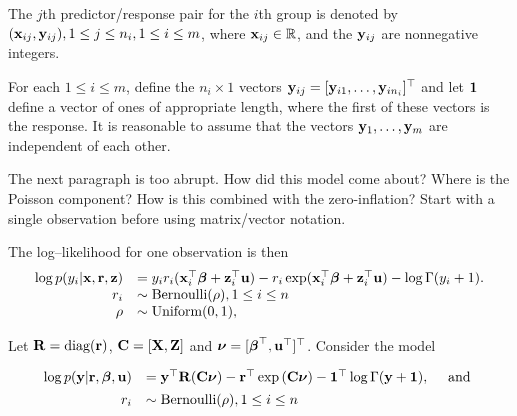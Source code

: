 \documentclass{article}[12pt]
\newcommand{\joc}[1]{{\color{red}#1}}
\begin{document}
The $j$th predictor/response pair for the $i$th group is denoted by $({\bf x}_{ij}, {\bf y}_{ij}), 1 \leq j \leq n_i, 1 \leq i \leq m$, where ${\bf x}_{ij} \in {\mathbb{R}}$, and the ${\bf y}_{ij}$ are nonnegative integers.

\noindent For each $1 \leq i \leq m$, define the $n_i \times 1$ vectors ${\bf y}_{ij} = [{\bf y}_{i 1}, \ldots, {\bf y}_{i
	n_i}]^\top$ and let ${\bf 1}$ define a vector of ones of appropriate length, where the first of these vectors is
the response. It is reasonable to assume that the vectors ${\bf y}_1, \ldots, {\bf y}_m$ are independent of each
other.

\joc{The next paragraph is too abrupt. How did this model come about? Where is the Poisson component? How is this combined with the zero-inflation?
Start with a single observation before using matrix/vector notation.}

\noindent The log--likelihood for one observation is then
\begin{equation*}
	\begin{array}{rl}
		\log p(y_i | {\bf x}, {\bf r}, {\bf z}) & = y_i r_i ({\bf x}_i^\top {\boldsymbol\beta} + {\bf z}_i^\top {\bf u}) - r_i \exp ({\bf x}_i^\top {\boldsymbol\beta} + {\bf z}_i^\top {\bf u}) - \log \Gamma (y_i + 1). \\
		r_i                         & \sim \text{Bernoulli}(\rho), 1 \leq i \leq n                                                                            \\
		\rho                        & \sim \mbox{Uniform}(0, 1),                                                                                              \\
	\end{array}
\end{equation*}

\noindent Let ${\bf R} = \text{diag}{({\bf r})}$, ${\bf C} = [{\bf X}, {\bf Z}]$ and ${\boldsymbol \nu} = [{\boldsymbol \beta}^\top, {\bf u}^\top]^\top$. Consider the model


\begin{equation}\label{eq:main}
	\begin{array}{rl}
		\log{p({\bf y}|{\bf r}, {\boldsymbol\beta}, {\bf u})} & = {\bf y}^\top {\bf R} ({\bf C}{\boldsymbol \nu}) - {\bf r}^\top \exp{({\bf C}{\boldsymbol\nu})} - {\bf 1}^\top \log{\Gamma{({\bf y}+ {\bf1})}}, \quad \mbox{ and } \\ [1ex]
		r_i                           & \sim \text{Bernoulli}(\rho), 1 \leq i \leq n                                                                     \\
	\end{array}
\end{equation}
\end{document}
